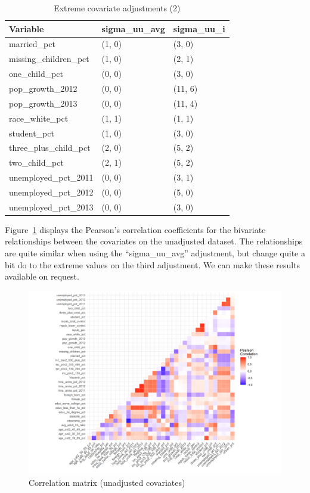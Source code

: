 \documentclass[12pt]{article}
\begin{document}
\begin{table}[ht]
\centering
\begin{tabular}{lll}
  \toprule
Variable & sigma\_uu\_avg & sigma\_uu\_i \\ 
  \midrule
  married\_pct & (1, 0) & (3, 0) \\ 
  missing\_children\_pct & (1, 0) & (2, 1) \\ 
  one\_child\_pct & (0, 0) & (3, 0) \\ 
  pop\_growth\_2012 & (0, 0) & (11, 6) \\ 
  pop\_growth\_2013 & (0, 0) & (11, 4) \\ 
  race\_white\_pct & (1, 1) & (1, 1) \\ 
  student\_pct & (1, 0) & (3, 0) \\ 
  three\_plus\_child\_pct & (2, 0) & (5, 2) \\ 
  two\_child\_pct & (2, 1) & (5, 2) \\ 
  unemployed\_pct\_2011 & (0, 0) & (3, 1) \\ 
  unemployed\_pct\_2012 & (0, 0) & (5, 0) \\ 
  unemployed\_pct\_2013 & (0, 0) & (3, 0) \\ 
   \bottomrule
\end{tabular}
    \caption{Extreme covariate adjustments (2)}
    \label{tab:extreme2}
\end{table}

Figure~\ref{fig:corrmatrix} displays the Pearson's correlation coefficients for the bivariate relationships between the covariates on the unadjusted dataset. The relationships are quite similar when using the ``sigma\_uu\_avg'' adjustment, but change quite a bit do to the extreme values on the third adjustment. We can make these results available on request.

\begin{figure}[]
\begin{center}
    \includegraphics[scale=0.6]{01_Plots/correlation-plot-c1-sigma-zero.png}
    \caption{Correlation matrix (unadjusted covariates)}
    \label{fig:corrmatrix}
\end{center}
\end{figure}
\end{document}
